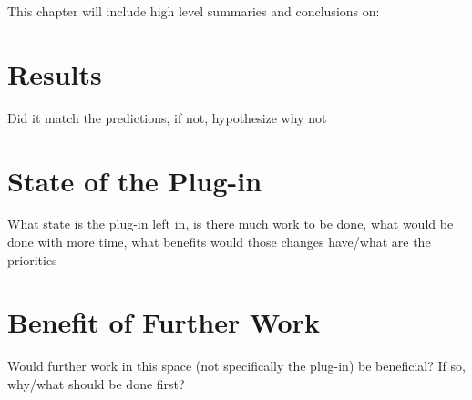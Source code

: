 This chapter will include high level summaries and conclusions on:

\section{Results}

Did it match the predictions, if not, hypothesize why not

\section{State of the Plug-in}

What state is the plug-in left in, is there much work to be done, what would be done with more time, what benefits would those changes have/what are the priorities

\section{Benefit of Further Work}

Would further work in this space (not specifically the plug-in) be beneficial? If so, why/what should be done first?
